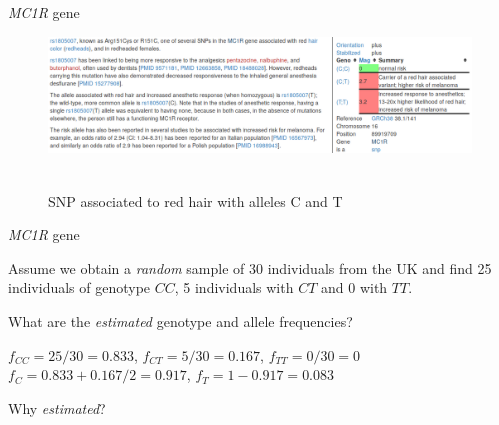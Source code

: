 \begin{frame}{\textit{MC1R} gene}

	\begin{figure}
                \includegraphics[width=1\textwidth]{Pics/mc1r_rs} \
                \caption{SNP associated to red hair with alleles C and T}
        \end{figure}

\end{frame}


\begin{frame}{\textit{MC1R} gene}

	Assume we obtain a \textit{random} sample of 30 individuals from the UK and find 25 individuals
	of genotype $CC$, 5 individuals with $CT$ and 0 with $TT$.

	\bigskip
	
	What are the \textit{estimated} genotype and allele frequencies?

	\pause
	\vskip 0.4cm
	$f_{CC}=25/30=0.833$, $f_{CT}=5/30=0.167$, $f_{TT}=0/30=0$ \\
	\pause
	\vskip 0.4cm
	$f_C=0.833+0.167/2=0.917$, $f_T=1-0.917=0.083$

	\vskip 0.4cm
	Why \textit{estimated}?

\end{frame}


